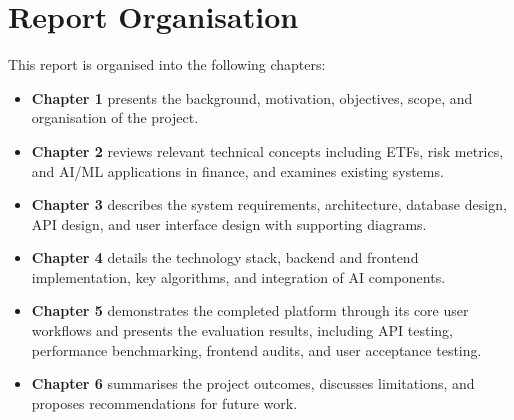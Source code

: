 \section{Report Organisation}

This report is organised into the following chapters:

\begin{itemize}
    \item \textbf{Chapter 1} presents the background, motivation, objectives, scope, and organisation of the project.
    \item \textbf{Chapter 2} reviews relevant technical concepts including ETFs, risk metrics, and AI/ML applications in finance, and examines existing systems.
    \item \textbf{Chapter 3} describes the system requirements, architecture, database design, API design, and user interface design with supporting diagrams.
    \item \textbf{Chapter 4} details the technology stack, backend and frontend implementation, key algorithms, and integration of AI components.
    \item \textbf{Chapter 5} demonstrates the completed platform through its core user workflows and presents the evaluation results, including API testing, performance benchmarking, frontend audits, and user acceptance testing.
    \item \textbf{Chapter 6} summarises the project outcomes, discusses limitations, and proposes recommendations for future work.
\end{itemize}
